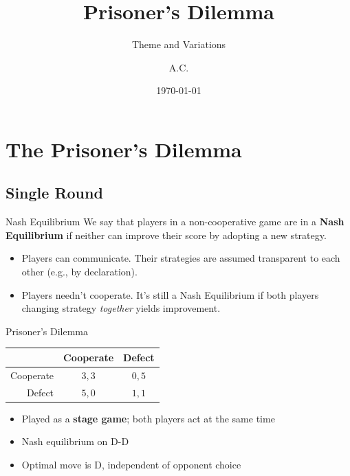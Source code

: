 \documentclass[pdf]{beamer}
\title{Prisoner's Dilemma}
\subtitle{Theme and Variations}
\author{A.C.}
\date{\today}
\begin{document}
\begin{frame}
  \titlepage
\end{frame}

\section{The Prisoner's Dilemma}
\subsection{Single Round}
\begin{frame}{Nash Equilibrium}
  We say that players in a non-cooperative game are in a \textbf{Nash Equilibrium}
  if neither can improve their score by adopting a new strategy.
  \begin{itemize}
  \pause\item Players can communicate. Their strategies are assumed transparent
    to each other (e.g., by declaration).
  \pause\item Players needn't cooperate. It's still a Nash Equilibrium if both
    players changing strategy \emph{together} yields improvement.
  \end{itemize}
\end{frame}

\begin{frame}{Prisoner's Dilemma}

  \begin{center}
    \begin{tabular}{r|c|c}
              & Cooperate & Defect \\ \hline
    Cooperate & $3,3$     & $0,5$  \\ \hline
    Defect    & $5,0$     & $1,1$  \\ 
    \end{tabular}
  \end{center}

  \begin{itemize}
  \item Played as a \textbf{stage game}; both players act at the same time
  \pause\item Nash equilibrium on D-D
  \pause\item Optimal move is D, independent of opponent choice
  \end{itemize}
\end{frame}
\end{document}
